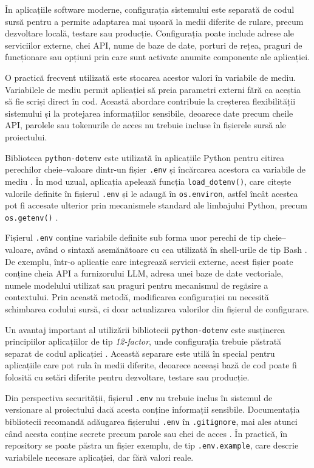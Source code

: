 \documentclass[12pt, a4paper, oneside, romanian]{teza-upb}
\begin{document}
În aplicațiile software moderne, configurația sistemului este separată de codul sursă pentru a permite adaptarea mai ușoară la medii diferite de rulare, precum dezvoltare locală, testare sau producție. Configurația poate include adrese ale serviciilor externe, chei API, nume de baze de date, porturi de rețea, praguri de funcționare sau opțiuni prin care sunt activate anumite componente ale aplicației.

O practică frecvent utilizată este stocarea acestor valori în variabile de mediu. Variabilele de mediu permit aplicației să preia parametri externi fără ca aceștia să fie scriși direct în cod. Această abordare contribuie la creșterea flexibilității sistemului și la protejarea informațiilor sensibile, deoarece date precum cheile API, parolele sau tokenurile de acces nu trebuie incluse în fișierele sursă ale proiectului.

Biblioteca \texttt{python-dotenv} este utilizată în aplicațiile Python pentru citirea perechilor cheie--valoare dintr-un fișier \texttt{.env} și încărcarea acestora ca variabile de mediu \cite{python_dotenv_doc}. În mod uzual, aplicația apelează funcția \texttt{load\_dotenv()}, care citește valorile definite în fișierul \texttt{.env} și le adaugă în \texttt{os.environ}, astfel încât acestea pot fi accesate ulterior prin mecanismele standard ale limbajului Python, precum \texttt{os.getenv()} \cite{python_dotenv_doc}.

Fișierul \texttt{.env} conține variabile definite sub forma unor perechi de tip cheie--valoare, având o sintaxă asemănătoare cu cea utilizată în shell-urile de tip Bash \cite{python_dotenv_doc}. De exemplu, într-o aplicație care integrează servicii externe, acest fișier poate conține cheia API a furnizorului LLM, adresa unei baze de date vectoriale, numele modelului utilizat sau praguri pentru mecanismul de regăsire a contextului. Prin această metodă, modificarea configurației nu necesită schimbarea codului sursă, ci doar actualizarea valorilor din fișierul de configurare.

Un avantaj important al utilizării bibliotecii \texttt{python-dotenv} este susținerea principiilor aplicațiilor de tip \textit{12-factor}, unde configurația trebuie păstrată separat de codul aplicației \cite{python_dotenv_doc}. Această separare este utilă în special pentru aplicațiile care pot rula în medii diferite, deoarece aceeași bază de cod poate fi folosită cu setări diferite pentru dezvoltare, testare sau producție.

Din perspectiva securității, fișierul \texttt{.env} nu trebuie inclus în sistemul de versionare al proiectului dacă acesta conține informații sensibile. Documentația bibliotecii recomandă adăugarea fișierului \texttt{.env} în \texttt{.gitignore}, mai ales atunci când acesta conține secrete precum parole sau chei de acces \cite{python_dotenv_doc}. În practică, în repository se poate păstra un fișier exemplu, de tip \texttt{.env.example}, care descrie variabilele necesare aplicației, dar fără valori reale.
\end{document}
